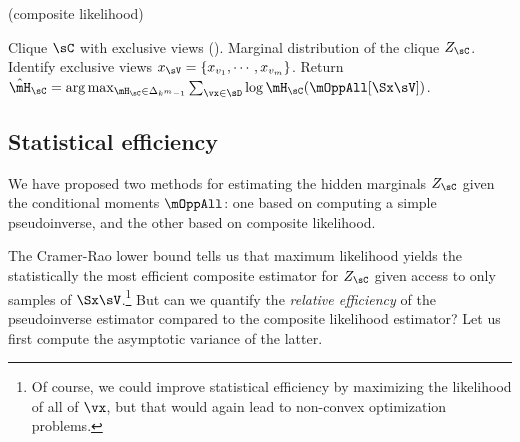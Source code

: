 \begin{algorithm}
  \caption{\LearnClique (composite likelihood)}
  \label{algo:piecewise}
  \begin{algorithmic}
    \REQUIRE Clique $\sC$ with exclusive views ().
    \ENSURE Marginal distribution of the clique $Z_\sC$.
\STATE Identify exclusive views $x_\sV = \{x_{v_1}, \cdots, x_{v_m}\}$.
\STATE Return $\hat \mH_\sC = \arg\max_{\mH_\sC \in \Delta_{k^m-1}} \sum_{\vx \in \sD} \log \mH_\sC(\mOppAll[\Sx \sV])$.
  \end{algorithmic}
\end{algorithm}

\subsection{Statistical efficiency}

We have proposed two methods for estimating the hidden marginals $Z_\sC$ given
the conditional moments $\mOppAll$: one based on computing a simple pseudoinverse,
and the other based on composite likelihood.

The Cramer-Rao lower bound tells us that maximum likelihood yields
the statistically the most efficient composite estimator for $Z_\sC$
given access to only samples of $\Sx\sV$.\footnote{Of course, we could improve statistical efficiency
by maximizing the likelihood of all of $\vx$, but that would again lead to non-convex optimization problems.}
But can we quantify the \emph{relative efficiency} of the pseudoinverse estimator
compared to the composite likelihood estimator?
Let us first compute the asymptotic variance of the latter.


